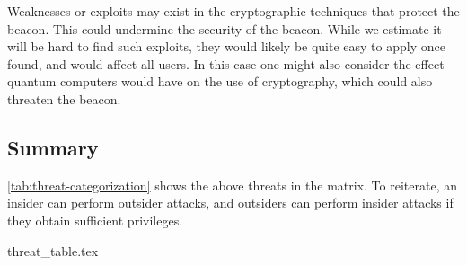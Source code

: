 Weaknesses or exploits may exist in the cryptographic techniques that protect the beacon.
This could undermine the security of the beacon.
While we estimate it will be hard to find such exploits, they would likely be quite easy to apply once found, and would affect all users.
In this case one might also consider the effect quantum computers would have on the use of cryptography, which could also threaten the beacon.

\subsection{Summary}

\cref{tab:threat-categorization} shows the above threats in the matrix.
To reiterate, an insider can perform outsider attacks, and outsiders can perform insider attacks if they obtain sufficient privileges.

{threat_table.tex}

